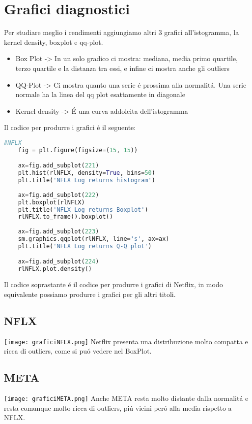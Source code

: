 \documentclass{report}
\begin{document}
\section{Grafici diagnostici}
Per studiare meglio i rendimenti aggiungiamo altri 3 grafici all'istogramma, la kernel density, boxplot e qq-plot.
\begin{itemize}[leftmargin=30pt, rightmargin=2cm]
\item Box Plot -> In un solo gradico ci mostra: mediana, media primo quartile, terzo quartile e la distanza tra essi, e infine ci mostra anche gli outliers
\item QQ-Plot -> Ci mostra quanto una serie é prossima alla normalitá. Una serie normale ha la linea del qq plot esattamente in diagonale
\item Kernel density -> É una curva addolcita dell'istogramma
\end{itemize}
Il codice per produrre i grafici é il seguente:
\begin{lstlisting}[language=python]
    #NFLX
    fig = plt.figure(figsize=(15, 15))

    ax=fig.add_subplot(221)
    plt.hist(rlNFLX, density=True, bins=50)
    plt.title('NFLX Log returns histogram')
    
    ax=fig.add_subplot(222)
    plt.boxplot(rlNFLX)
    plt.title('NFLX Log returns Boxplot')
    rlNFLX.to_frame().boxplot()
    
    ax=fig.add_subplot(223)
    sm.graphics.qqplot(rlNFLX, line='s', ax=ax)
    plt.title('NFLX Log returns Q-Q plot')

    ax=fig.add_subplot(224)
    rlNFLX.plot.density()
\end{lstlisting}
Il codice soprastante é il codice per produrre i grafici di Netflix, in modo equivalente possiamo produrre i grafici per gli altri titoli.
\subsection{NFLX}
\texttt{[image: graficiNFLX.png]}
Netflix presenta una distribuzione molto compatta e ricca di outliers, come si puó vedere nel BoxPlot.
\subsection{META}
\texttt{[image: graficiMETA.png]}
Anche META resta molto distante dalla normalitá e resta comunque molto ricca di outliers, piú vicini peró alla media rispetto a NFLX.
\end{document}
